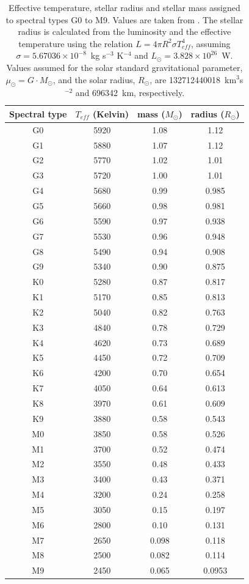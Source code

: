 \documentclass[11pt]{article}      %
\begin{document}
\begin{table}[hb]
  \begin{center}
  \caption{Effective temperature, stellar radius and stellar mass assigned to spectral types G0 to M9. Values are taken from \cite{stellarParameters}. The stellar radius is calculated from the luminosity and the effective temperature using the relation $L=4\pi R^2 \sigma T_{eff}^4$, assuming $\sigma=5.67036\times10^{-8}$~kg s$^{-3}$ K$^{-4}$ and $L_{\odot}=3.828\times10^{26}$~W. Values assumed for the solar standard gravitational parameter, $\mu_{\odot}=G\cdot M_{\odot}$,  and the solar radius, $R_{\odot}$, are 132712440018~km$^3$s$^{-2}$ and 696342~km, respectively.}
  \begin{tabular}{| c | c | c | c |}
    \hline 
    Spectral type & $T_{eff}$ (Kelvin) & mass ($M_{\odot}$) & radius ($R_{\odot}$)\\
    \hline
G0 & 5920 & 1.08 & 1.12 \\
G1 & 5880 & 1.07 & 1.12 \\
G2 & 5770 & 1.02 & 1.01 \\
G3 & 5720 & 1.00 & 1.01 \\
G4 & 5680 & 0.99 & 0.985 \\
G5 & 5660 & 0.98 & 0.981 \\
G6 & 5590 & 0.97 & 0.938 \\
G7 & 5530 & 0.96 & 0.948 \\
G8 & 5490 & 0.94 & 0.908 \\
G9 & 5340 & 0.90 & 0.875 \\
K0 & 5280 & 0.87 & 0.817 \\
K1 & 5170 & 0.85 & 0.813 \\
K2 & 5040 & 0.82 & 0.763 \\
K3 & 4840 & 0.78 & 0.729 \\
K4 & 4620 & 0.73 & 0.689 \\
K5 & 4450 & 0.72 & 0.709 \\
K6 & 4200 & 0.70 & 0.654 \\
K7 & 4050 & 0.64 & 0.613 \\
K8 & 3970 & 0.61 & 0.609 \\
K9 & 3880 & 0.58 & 0.543 \\
M0 & 3850 & 0.58 & 0.526 \\
M1 & 3700 & 0.52 & 0.474 \\
M2 & 3550 & 0.48 & 0.433 \\
M3 & 3400 & 0.43 & 0.371 \\
M4 & 3200 & 0.24 & 0.258 \\
M5 & 3050 & 0.15 & 0.197 \\
M6 & 2800 & 0.10 & 0.131 \\
M7 & 2650 & 0.098 & 0.118 \\
M8 & 2500 & 0.082 & 0.114 \\
M9 & 2450 & 0.065 & 0.0953 \\
    \hline
  \end{tabular}
  \label{tab:starProperties2}
  \end{center}
\end{table}
\end{document}
